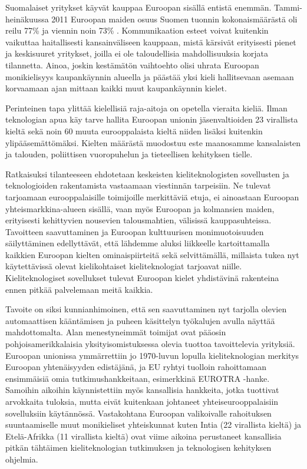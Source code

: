 \documentclass[]{../../metanetpaper}
\begin{document}
\begin{Parallel}[c]{70mm}{70mm}
{Suomalaiset yritykset käyvät kauppaa Euroopan sisällä entistä enemmän.
Tammi-heinäkuussa 2011 Euroopan maiden osuus Suomen tuonnin
kokonaismäärästä oli reilu 77\% ja viennin noin 73\% \cite{SVT}.
Kommunikaation esteet voivat kuitenkin vaikuttaa haitallisesti
kansainväliseen kauppaan, mistä kärsivät erityisesti pienet ja
keskisuuret yritykset, joilla ei ole taloudellisia mahdollisuuksia
korjata tilannetta. Ainoa, joskin kestämätön vaihtoehto olisi uhrata
Euroopan monikielisyys kaupankäynnin alueella ja päästää yksi kieli
hallitsevaan asemaan korvaamaan ajan mittaan kaikki muut kaupankäynnin
kielet.

Perinteinen tapa ylittää kielellisiä raja-aitoja on opetella vieraita
kieliä.  Ilman teknologian apua käy tarve hallita Euroopan unionin
jäsenvaltioiden 23 virallista kieltä sekä noin 60 muuta eurooppalaista
kieltä niiden lisäksi kuitenkin ylipääsemättömäksi. Kielten määrästä
muodostuu este maanosamme kansalaisten ja talouden, poliittisen
vuoropuhelun ja tieteellisen kehityksen tielle.

Ratkaisuksi tilanteeseen ehdotetaan keskeisten kieliteknologisten
sovellusten ja teknologioiden rakentamista vastaamaan viestinnän
tarpeisiin. Ne tulevat tarjoamaan eurooppalaisille toimijoille
merkittäviä etuja, ei ainoastaan Euroopan yhteismarkkina-alueen
sisällä, vaan myös Euroopan ja kolmansien maiden, erityisesti
kehittyvien nousevien talousmahtien, välisissä
kauppasuhteissa. Tavoitteen saavuttaminen ja Euroopan kulttuurisen
monimuotoisuuden säilyttäminen edellyttävät, että lähdemme aluksi
liikkeelle kartoittamalla kaikkien Euroopan kielten ominaispiirteitä
sekä selvittämällä, millaista tukea nyt käytettävissä olevat
kielikohtaiset kieliteknologiat tarjoavat niille. Kieliteknologiset
sovellukset tulevat Euroopan kielet yhdistävinä rakenteina ennen
pitkää palvelemaan meitä kaikkia.


Tavoite on siksi kunnianhimoinen, että sen saavuttaminen nyt tarjolla olevien
automaattisen kääntämisen ja puheen käsittelyn työkalujen avulla näyttää
mahdottomalta. Alan menestyneimmät toimijat ovat pääosin pohjoisamerikkalaisia
yksityisomistuksessa olevia tuottoa tavoittelevia yrityksiä. Euroopan unionissa
ymmärrettiin jo 1970-luvun lopulla kieliteknologian merkitys Euroopan
yhtenäisyyden edistäjänä, ja EU ryhtyi tuolloin rahoittamaan ensimmäisiä omia
tutkimushankkeitaan, esimerkkinä EUROTRA -hanke. Samoihin aikoihin
käynnistettiin myös kansallisia hankkeita, jotka tuottivat arvokkaita tuloksia,
mutta eivät kuitenkaan johtaneet yhteiseurooppalaisiin sovelluksiin
käytännössä. Vastakohtana Euroopan valikoivalle rahoituksen suuntaamiselle muut
monikieliset yhteiskunnat kuten Intia (22 virallista kieltä) ja Etelä-Afrikka
(11 virallista kieltä) ovat viime aikoina perustaneet kansallisia pitkän
tähtäimen kieliteknologian tutkimuksen ja teknologisen kehityksen ohjelmia.

}
\end{Parallel}
\end{document}
